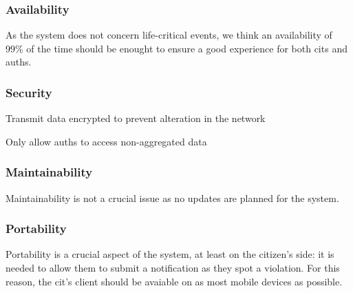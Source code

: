 \documentclass{article}
\begin{document}
		\subsubsection{Availability}
			As the system does not concern life-critical events, we think an availability of 99\% of the time should be enought to ensure a good experience for both cits and auths.
			
		\subsubsection{Security}
			\begin{list}{-}{}
				\item Transmit data encrypted to prevent alteration in the network
				\item Only allow auths to access non-aggregated data
			\end{list}
			
		\subsubsection{Maintainability}
			Maintainability is not a crucial issue as no updates are planned for the system.
			
		\subsubsection{Portability}
			Portability is a crucial aspect of the system, at least on the citizen's side: it is needed to allow them to submit a notification as they spot a violation. For this reason, the cit's client should be avaiable on as most mobile devices as possible.
			
\end{document}
